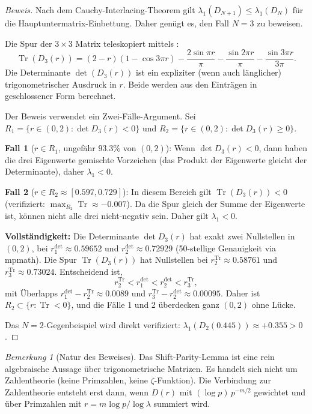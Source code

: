 ﻿\documentclass[12pt,a4paper]{article}
\theoremstyle{definition}
\theoremstyle{remark}
\newtheorem{remark}[theorem]{Bemerkung}
\begin{document}
\begin{proof}[Beweis]
Nach dem Cauchy-Interlacing-Theorem gilt
$\lambda_1(D_{N+1}) \leq \lambda_1(D_N)$
für die Hauptuntermatrix-Einbettung.
Daher genügt es, den Fall $N = 3$ zu beweisen.

Die Spur der $3 \times 3$ Matrix teleskopiert mittels :
\[
  \operatorname{Tr}(D_3(r)) = (2-r)(1 - \cos 3\pi r) - \frac{2\sin\pi r}{\pi} - \frac{\sin 2\pi r}{\pi} - \frac{\sin 3\pi r}{3\pi}.
\]
Die Determinante $\det(D_3(r))$ ist ein expliziter (wenn auch länglicher) trigonometrischer Ausdruck in $r$. Beide werden aus den Einträgen in geschlossener Form berechnet.

Der Beweis verwendet ein Zwei-Fälle-Argument. Sei $R_1 = \{r \in (0,2) : \det D_3(r) < 0\}$ und $R_2 = \{r \in (0,2) : \det D_3(r) \geq 0\}$.

\medskip
\noindent\textbf{Fall 1} ($r \in R_1$, ungefähr $93.3\%$ von $(0,2)$):
Wenn $\det D_3(r) < 0$, dann haben die drei Eigenwerte gemischte Vorzeichen (das Produkt der Eigenwerte gleicht der Determinante), daher $\lambda_1 < 0$.

\medskip
\noindent\textbf{Fall 2} ($r \in R_2 \approx [0.597, 0.729]$):
In diesem Bereich gilt $\operatorname{Tr}(D_3(r)) < 0$ (verifiziert: $\max_{R_2}\operatorname{Tr} \approx -0.007$). Da die Spur gleich der Summe der Eigenwerte ist, können nicht alle drei nicht-negativ sein. Daher gilt $\lambda_1 < 0$.

\medskip
\noindent\textbf{Vollständigkeit:}
Die Determinante $\det D_3(r)$ hat exakt zwei Nullstellen in $(0,2)$, bei $r_1^{\det} \approx 0.59652$ und $r_2^{\det} \approx 0.72929$ (50-stellige Genauigkeit via mpmath). Die Spur $\operatorname{Tr}(D_3(r))$ hat Nullstellen bei $r_2^{\operatorname{Tr}} \approx 0.58761$ und $r_3^{\operatorname{Tr}} \approx 0.73024$. Entscheidend ist,
\[
  r_2^{\operatorname{Tr}} < r_1^{\det} < r_2^{\det} < r_3^{\operatorname{Tr}},
\]
mit Überlapps $r_1^{\det} - r_2^{\operatorname{Tr}} \approx 0.0089$ und $r_3^{\operatorname{Tr}} - r_2^{\det} \approx 0.00095$.
Daher ist $R_2 \subset \{r : \operatorname{Tr} < 0\}$, und die Fälle 1 und 2 überdecken ganz $(0,2)$ ohne Lücke.

Das $N = 2$-Gegenbeispiel wird direkt verifiziert: $\lambda_1(D_2(0.445)) \approx +0.355 > 0$.
\end{proof}

\begin{remark}[Natur des Beweises]
Das Shift-Parity-Lemma ist eine rein algebraische Aussage über trigonometrische Matrizen. Es handelt sich nicht um Zahlentheorie (keine Primzahlen, keine $\zeta$-Funktion). Die Verbindung zur Zahlentheorie entsteht erst dann, wenn $D(r)$ mit $(\log p)\,p^{-m/2}$ gewichtet und über Primzahlen mit $r = m\log p / \log\lambda$ summiert wird.
\end{remark}
\end{document}
